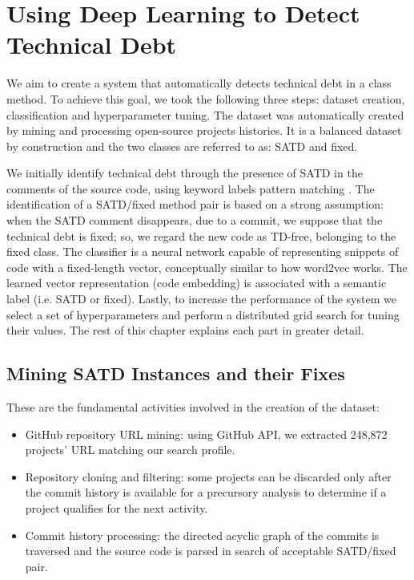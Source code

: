 \chapter{Using Deep Learning to Detect Technical Debt}

We aim to create a system that automatically detects technical debt in a class method. To achieve this goal, we took the following three steps: dataset creation, classification and hyperparameter tuning.
The dataset was automatically created by mining and processing open-source projects histories. It is a balanced dataset by construction and the two classes are referred to as: SATD and fixed.

We initially identify technical debt through the presence of SATD in the comments of the source code, using keyword labels pattern matching \cite{potdar2014exploratory} \cite{rantala2020prevalence}.
The identification of a SATD/fixed method pair is based on a strong assumption: when the SATD comment disappears, due to a commit, we suppose that the technical debt is fixed; so, we regard the new code as TD-free, belonging to the fixed class.
The classifier is a neural network capable of representing snippets of code with a fixed-length vector, conceptually similar to how word2vec works. The learned vector representation (code embedding) is associated with a semantic label (i.e. SATD or fixed).
Lastly, to increase the performance of the system we select a set of hyperparameters and perform a distributed grid search for tuning their values. The rest of this chapter explains each part in greater detail.

\section{Mining SATD Instances and their Fixes}

These are the fundamental activities involved in the creation of the dataset:
\begin{itemize}
    \item GitHub repository URL mining: using GitHub API, we extracted 248,872 projects' URL matching our search profile.
    \item Repository cloning and filtering: some projects can be discarded only after the commit history is available for a precursory analysis to determine if a project qualifies for the next activity.
    \item Commit history processing: the directed acyclic graph of the commits is traversed and the source code is parsed in search of acceptable SATD/fixed pair.
\end{itemize}

